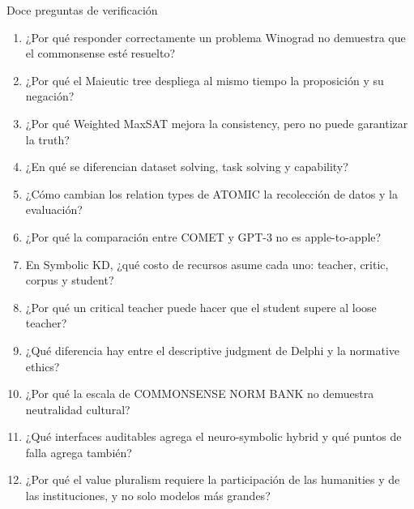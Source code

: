 \begin{importantbox}{Doce preguntas de verificación}
\begin{enumerate}
  \item ¿Por qué responder correctamente un problema Winograd no demuestra que el commonsense esté resuelto?
  \item ¿Por qué el Maieutic tree despliega al mismo tiempo la proposición y su negación?
  \item ¿Por qué Weighted MaxSAT mejora la consistency, pero no puede garantizar la truth?
  \item ¿En qué se diferencian dataset solving, task solving y capability?
  \item ¿Cómo cambian los relation types de ATOMIC la recolección de datos y la evaluación?
  \item ¿Por qué la comparación entre COMET y GPT-3 no es apple-to-apple?
  \item En Symbolic KD, ¿qué costo de recursos asume cada uno: teacher, critic, corpus y student?
  \item ¿Por qué un critical teacher puede hacer que el student supere al loose teacher?
  \item ¿Qué diferencia hay entre el descriptive judgment de Delphi y la normative ethics?
  \item ¿Por qué la escala de COMMONSENSE NORM BANK no demuestra neutralidad cultural?
  \item ¿Qué interfaces auditables agrega el neuro-symbolic hybrid y qué puntos de falla agrega también?
  \item ¿Por qué el value pluralism requiere la participación de las humanities y de las instituciones, y no solo modelos más grandes?
\end{enumerate}
\end{importantbox}



